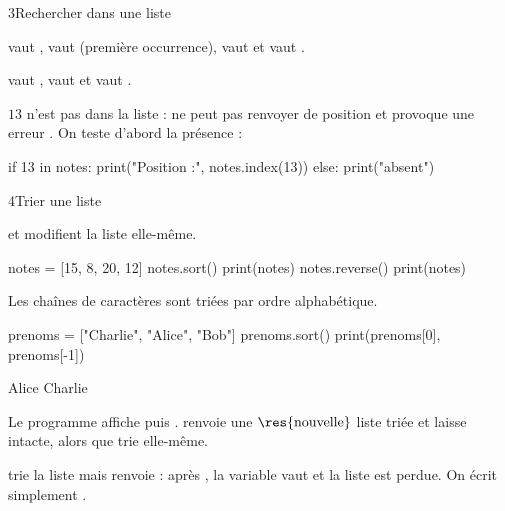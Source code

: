 \begin{corrige}{3}{Rechercher dans une liste}
\begin{questions}
  \item {} vaut ,  vaut  (première occurrence),  vaut
     et  vaut .
  \item {} vaut ,  vaut  et  vaut
    .
  \item $13$ n'est pas dans la liste :  ne peut pas renvoyer de position et provoque une erreur . On teste
    d'abord la présence :
\begin{python}
if 13 in notes:
    print("Position :", notes.index(13))
else:
    print("absent")
\end{python}
\end{questions}
\end{corrige}

\begin{corrige}{4}{Trier une liste}
\begin{questions}
  \item {} et  modifient la liste elle-même.
\begin{codecote}[0.5]
\begin{pythoncol}
notes = [15, 8, 20, 12]
notes.sort()
print(notes)
notes.reverse()
print(notes)
\end{pythoncol}
\cote
\begin{consolecol}
[8, 12, 15, 20]
[20, 15, 12, 8]
\end{consolecol}
\end{codecote}
  \item Les chaînes de caractères sont triées par ordre alphabétique.
\begin{codecote}[0.58]
\begin{pythoncol}
prenoms = ["Charlie", "Alice", "Bob"]
prenoms.sort()
print(prenoms[0], prenoms[-1])
\end{pythoncol}
\cote
\begin{consolecol}
Alice Charlie
\end{consolecol}
\end{codecote}
  \item Le programme affiche \code{[15, 8, 20, 12]} puis \code{[8, 12, 15, 20]}.  renvoie une $\res{\text{nouvelle}}$
    liste triée et laisse  intacte, alors que  trie  elle-même.
  \item {} trie la liste mais renvoie  : après , la variable  vaut  et la
    liste est perdue. On écrit simplement .
\end{questions}
\end{corrige}

